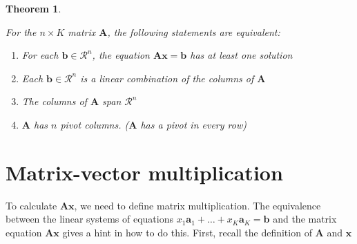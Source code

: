 \documentclass[
]{book}
\newtheorem{theorem}{Theorem}[chapter]
\theoremstyle{definition}
\theoremstyle{definition}
\theoremstyle{definition}
\theoremstyle{remark}
\begin{document}
\begin{theorem}
\protect\hypertarget{thm:unlabeled-div-67}{}\label{thm:unlabeled-div-67}

For the \(n \times K\) matrix \(\mathbf{A}\), the following statements are equivalent:

\begin{enumerate}
\def\labelenumi{\alph{enumi})}
\item
  For each \(\mathbf{b} \in \mathcal{R}^n\), the equation \(\mathbf{A} \mathbf{x} = \mathbf{b}\) has at least one solution
\item
  Each \(\mathbf{b} \in \mathcal{R}^n\) is a linear combination of the columns of \(\mathbf{A}\)
\item
  The columns of \(\mathbf{A}\) span \(\mathcal{R}^n\)
\item
  \(\mathbf{A}\) has \(n\) pivot columns. (\(\mathbf{A}\) has a pivot in every row)
\end{enumerate}

\end{theorem}

\hypertarget{matrix-vector-multiplication}{%
\section{Matrix-vector multiplication}\label{matrix-vector-multiplication}}

To calculate \(\mathbf{A} \mathbf{x}\), we need to define matrix multiplication. The equivalence between the linear systems of equations \(x_1 \mathbf{a}_1 + \ldots + x_K \mathbf{a}_K = \mathbf{b}\) and the matrix equation \(\mathbf{A} \mathbf{x}\) gives a hint in how to do this. First, recall the definition of \(\mathbf{A}\) and \(\mathbf{x}\)
\end{document}
